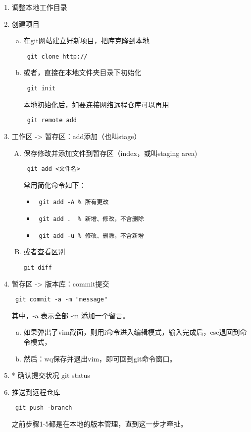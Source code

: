 \documentclass[UTF8,AutoFakeBold,zihao=-4,scheme=chinese]{ctexart}
\begin{document}
\begin{enumerate}[1.]
  \item 调整本地工作目录
  \item 创建项目
  \begin{enumerate}[a.]
    \item 在git网站建立好新项目，把库克隆到本地

      \verb| git clone http:// |

    \item 或者，直接在本地文件夹目录下初始化

      \verb| git init |

      本地初始化后，如要连接网络远程仓库可以再用

    \verb| git remote add |
  \end{enumerate}

  \item 工作区 -> 暂存区：add添加（也叫stage）
    \begin{enumerate}[A.]
      \item 保存修改并添加文件到暂存区（index，或叫staging area)

      \verb| git add <文件名> |

      常用简化命令如下：
        \begin{itemize}[\textbullet]
          \item \verb| git add -A % 所有更改 |
          \item \verb| git add .  % 新增、修改，不含删除 |
          \item \verb| git add -u % 修改、删除，不含新增 |
        \end{itemize}

      \item 或者查看区别

      \verb!git diff!
    \end{enumerate}

  \item 暂存区 -> 版本库：commit提交

  \verb| git commit -a -m "message" |

  其中，-a 表示全部 -m 添加一个留言。
  \begin{enumerate}[(a)]
    \item 如果弹出了vim截面，则用i命令进入编辑模式，输入完成后，esc退回到命令模式，
    \item 然后：wq保存并退出vim，即可回到git命令窗口。
  \end{enumerate}

  \item * 确认提交状况  git status

  \item 推送到远程仓库

  \verb| git push -branch |

  之前步骤1-5都是在本地的版本管理，直到这一步才牵扯。
\end{enumerate}
\end{document}
